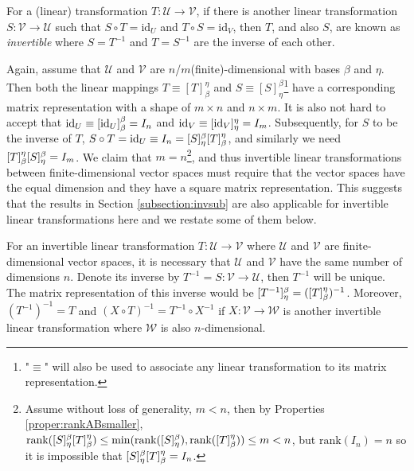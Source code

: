 \begin{defn}
\label{defn:inversetrans}
For a (linear) transformation $T: \mathcal{U} \to \mathcal{V}$, if there is another linear transformation $S: \mathcal{V} \to \mathcal{U}$ such that $S \circ T = \text{id}_{U}$ and $T \circ S = \text{id}_{V}$, then $T$, and also $S$, are known as \textit{invertible} where $S = T^{-1}$ and $T = S^{-1}$ are the inverse of each other.
\end{defn}
Again, assume that $\mathcal{U}$ and $\mathcal{V}$ are $n$/$m$(finite)-dimensional with bases $\mathcal{\beta}$ and $\mathcal{\eta}$. Then both the linear mappings $T \equiv [T]_\beta^\eta$ and $S \equiv [S]_\eta^\beta$\footnote{"$\equiv$" will also be used to associate any linear transformation to its matrix representation.} have a corresponding matrix representation with a shape of $m \times n$ and $n \times m$. It is also not hard to accept that $\text{id}_U \equiv \smash{[\text{id}_U]_\beta^\beta} = I_n$ and $\text{id}_V \equiv \smash{[\text{id}_V]_\eta^\eta} = I_m$. Subsequently, for $S$ to be the inverse of $T$, $S \circ T = \text{id}_U \equiv I_n = \smash{[S]_\eta^\beta[T]_\beta^\eta}$, and similarly we need $\smash{[T]_\beta^\eta[S]_\eta^\beta} = I_m$. We claim that $m = n$\footnote{Assume without loss of generality, $m < n$, then by Properties \ref{proper:rankABsmaller}, $\text{rank}(\smash{[S]_\eta^\beta[T]_\beta^\eta}) \leq \min(\text{rank}(\smash{[S]_\eta^\beta}), \text{rank}(\smash{[T]_\beta^\eta})) \leq m < n$, but $\text{rank}(I_n) = n$ so it is impossible that $\smash{[S]_\eta^\beta[T]_\beta^\eta} = I_n$.}, and thus invertible linear transformations between finite-dimensional vector spaces must require that the vector spaces have the equal dimension and they have a square matrix representation. This suggests that the results in Section \ref{subsection:invsub} are also applicable for invertible linear transformations here and we restate some of them below.
\begin{proper}
For an invertible linear transformation $T: \mathcal{U} \to \mathcal{V}$ where $\mathcal{U}$ and $\mathcal{V}$ are finite-dimensional vector spaces, it is necessary that $\mathcal{U}$ and $\mathcal{V}$ have the same number of dimensions $n$. Denote its inverse by $T^{-1} = S: \mathcal{V} \to \mathcal{U}$, then $T^{-1}$ will be unique. The matrix representation of this inverse would be $\smash{[T^{-1}]_\eta^\beta} = \smash{([T]_\beta^\eta)^{-1}}$. Moreover, $(T^{-1})^{-1} = T$ and $(X \circ T)^{-1} = T^{-1} \circ X^{-1}$ if $X: \mathcal{V} \to \mathcal{W}$ is another invertible linear transformation where $\mathcal{W}$ is also $n$-dimensional.
\end{proper}

